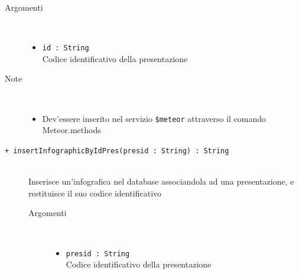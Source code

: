 \begin{description}
\begin{description}
		\begin{description}
			\item[Argomenti] \hfill \\
				\begin{itemize}
				
					\item \texttt{id : String			} \hfill \\
					Codice identificativo della presentazione
					
				\end{itemize}
			\item[Note] \hfill \\
			\begin{itemize}
					\item Dev'essere inserito nel servizio \texttt{\$meteor} attraverso il comando Meteor.methods
				\end{itemize}
		\end{description}
	\end{description}
	
	\begin{description}
		\item[\texttt{+  insertInfographicByIdPres(presid : String) : String			}] \hfill \\
			Inserisce un'infografica nel database associandola ad una presentazione, e restituisce il suo codice identificativo
			
		\begin{description}
			\item[Argomenti] \hfill \\
				\begin{itemize}
				
					\item \texttt{presid : String			} \hfill \\
					Codice identificativo della presentazione
					

\end{itemize}
\end{description}
\end{description}
\end{description}
